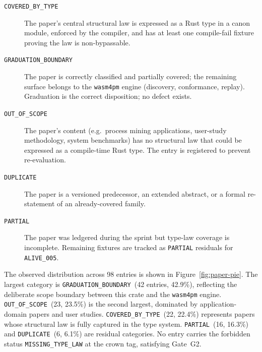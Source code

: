 \begin{description}
  \item[\texttt{COVERED\_BY\_TYPE}] The paper's central structural law is
    expressed as a Rust type in a canon module, enforced by the compiler, and
    has at least one compile-fail fixture proving the law is non-bypassable.
  \item[\texttt{GRADUATION\_BOUNDARY}] The paper is correctly classified and
    partially covered; the remaining surface belongs to the \texttt{wasm4pm}
    engine (discovery, conformance, replay). Graduation is the correct
    disposition; no defect exists.
  \item[\texttt{OUT\_OF\_SCOPE}] The paper's content (e.g.\ process mining
    applications, user-study methodology, system benchmarks) has no structural
    law that could be expressed as a compile-time Rust type. The entry is
    registered to prevent re-evaluation.
  \item[\texttt{DUPLICATE}] The paper is a versioned predecessor, an extended
    abstract, or a formal re-statement of an already-covered family.
  \item[\texttt{PARTIAL}] The paper was ledgered during the sprint but
    type-law coverage is incomplete. Remaining fixtures are tracked as
    \texttt{PARTIAL} residuals for \texttt{ALIVE\_005}.
\end{description}

The observed distribution across 98 entries is shown in
Figure~\ref{fig:paper-pie}. The largest category is
\texttt{GRADUATION\_BOUNDARY}~(42 entries, 42.9\%), reflecting the
deliberate scope boundary between this crate and the \texttt{wasm4pm} engine.
\texttt{OUT\_OF\_SCOPE}~(23, 23.5\%) is the second largest, dominated by
application-domain papers and user studies. \texttt{COVERED\_BY\_TYPE}~(22,
22.4\%) represents papers whose structural law is fully captured in the type
system. \texttt{PARTIAL}~(16, 16.3\%) and \texttt{DUPLICATE}~(6, 6.1\%) are
residual categories. No entry carries the forbidden status
\texttt{MISSING\_TYPE\_LAW} at the crown tag, satisfying Gate~G2.

